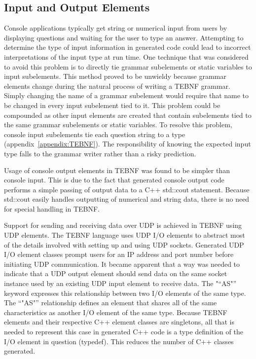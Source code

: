 \subsection{Input and Output Elements} \label{ssec:IoElements}
Console applications typically get string or numerical input from users by displaying questions and waiting for the user to type an answer.  Attempting to determine the type of input information in generated code could lead to incorrect interpretations of the input type at run time.  One technique that was considered to avoid this problem is to directly tie grammar subelements or static variables to input subelements.  This method proved to be unwieldy because grammar elements change during the natural process of writing a TEBNF grammar.  Simply changing the name of a grammar subelement would require that name to be changed in every input subelement tied to it.  This problem could be compounded as other input elements are created that contain subelements tied to the same grammar subelements or static variables.   To resolve this problem, console input subelements tie each question string to a type (appendix~\ref{appendix:TEBNF}).  The responsibility of knowing the expected input type falls to the grammar writer rather than a risky prediction.

\indent
Usage of console output elements in TEBNF was found to be simpler than console input.  This is due to the fact that generated console output code performs a simple passing of output data to a C++ std::cout statement.   Because std::cout easily handles outputting of numerical and string data, there is no need for special handling in TEBNF.

\indent
Support for sending and receiving data over UDP is achieved in TEBNF using UDP elements.  The TEBNF language uses UDP I/O elements to abstract most of the details involved with setting up and using UDP sockets.  Generated UDP I/O element classes prompt users for an IP address and port number before initiating UDP communication.  It became apparent that a way was needed to indicate that a UDP output element should send data on the same socket instance used by an existing UDP input element to receive data.  The "“AS"” keyword expresses this relationship between two I/O elements of the same type.  The “"AS"” relationship defines an element that shares all of the same characteristics as another I/O element of the same type.  Because TEBNF elements and their respective C++ element classes are singletons, all that is needed to represent this case in generated C++ code is a type definition of the I/O element in question (typedef).  This reduces the number of C++ classes generated.

